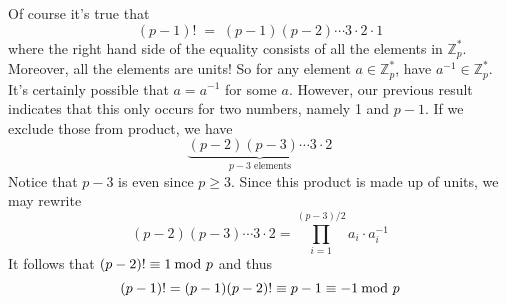 \documentclass[../hw_sols.tex]{subfiles}
\begin{document}
\begin{description}
\begin{solution}
Of course it's true that
	\[ (p-1)! \; = \; (p-1)(p-2) \cdots 3 \cdot 2 \cdot 1 \]
where the right hand side of the equality consists of all the elements in 
$\mathbb{Z}_p^*$. Moreover, all the elements are units! So for any element 
$a \in \mathbb{Z}_p^*$, have $a^{-1} \in \mathbb{Z}_p^*$. It's certainly 
possible that $a = a^{-1}$ for some $a$. However, our previous result 
indicates that this only occurs for two numbers, namely 1 and $p-1$. If we 
exclude those from product, we have
	\[ \underbrace{(p-2)(p-3) \cdots 3 \cdot 2}_{p-3 \text{ elements}} \]
Notice that $p-3$ is even since $p \geq 3$. Since this product is made up of 
units, we may rewrite
	\[ (p-2)(p-3) \cdots 3 \cdot 2 
	= \prod_{i=1}^{(p-3)/2} a_i \cdot a_i^{-1} \]
It follows that $(p-2)! \equiv 1 \tmod{p}$ and thus
	\[ (p-1)! = (p-1)(p-2)! \equiv p-1 \equiv -1 \tmod{p} \]
\end{solution}

\end{description}
\end{document}
